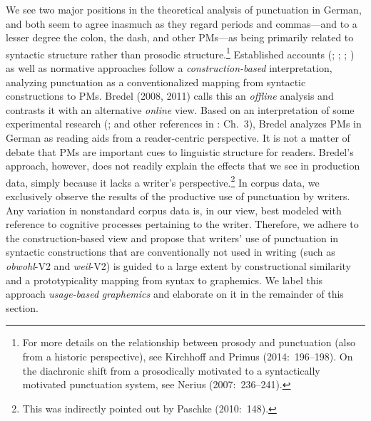 We see two major positions in the theoretical analysis of punctuation in German, and both seem to agree inasmuch as they regard periods and commas—and to a lesser degree the colon, the dash, and other PMs—as being primarily related to syntactic structure rather than prosodic structure.\footnote{For more details on the relationship between prosody and punctuation (also from a historic perspective), see Kirchhoff and Primus (2014:~196–198). On the diachronic shift from a prosodically motivated to a syntactically motivated punctuation system, see Nerius (2007:~236–241).} Established accounts (\citealt{Mentrup1983}; \citealt{Behrens1989}; \citealt{Baudusch1995}; \citealt{Gallmann1996}) as well as norma\-tive approaches \citep{AugstEtAl1997} fol\-low a \textit{construction-based} interpretation, analyzing punctuation as a conventionalized mapping from syntactic constructions to PMs. Bredel (2008, 2011) calls this an \textit{offline} analysis and contrasts it with an alternative \textit{online} view. Based on an interpretation of some experimental research (\citealt{FrazierRayner1988}; \citealt{MazukaLust1990} and other references in \citealt{Bredel2008}: Ch.~3), Bredel analyzes PMs in German as reading aids from a reader-centric perspective. It is not a matter of debate that PMs are important cues to linguistic structure for readers. Bredel’s approach, however, does not readily explain the effects that we see in production data, simply because it lacks a writer’s perspective.\footnote{This was indirectly pointed out by Paschke (2010:~148).} In corpus data, we exclusively observe the results of the productive use of punctuation by writers. Any variation in nonstandard corpus data is, in our view, best modeled with reference to cognitive processes pertaining to the writer. Therefore, we adhere to the construction-based view and propose that writers’ use of punctuation in syntactic constructions that are conventionally not used in writing (such as \textit{obwohl}{}-V2 and \textit{weil}{}-V2) is guided to a large extent by constructional similarity and a prototypicality mapping from syntax to graphemics. We label this approach \textit{usage-based} \textit{graphemics} and elaborate on it in the remainder of this section.



